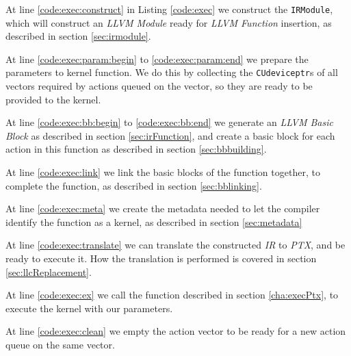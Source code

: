 At line \ref{code:exec:construct} in Listing \ref{code:exec} we construct the \texttt{IRModule}, which will construct an \textit{LLVM Module} ready for \textit{LLVM Function} insertion, as described in section \ref{sec:irmodule}.

At line \ref{code:exec:param:begin} to \ref{code:exec:param:end} we prepare the parameters to kernel function. We do this by collecting the \texttt{CUdeviceptr}s of all vectors required by actions queued on the vector, so they are ready to be provided to the kernel.

At line \ref{code:exec:bb:begin} to \ref{code:exec:bb:end} we generate an \textit{LLVM Basic Block} as described in section \ref{sec:irFunction}, and create a basic block for each action in this function as described in section \ref{sec:bbbuilding}.

At line \ref{code:exec:link} we link the basic blocks of the function together, to complete the function, as described in section \ref{sec:bblinking}.

At line \ref{code:exec:meta} we create the metadata needed to let the compiler identify the function as a kernel, as described in section \ref{sec:metadata}

At line \ref{code:exec:translate} we can translate the constructed \textit{IR} to \textit{PTX}, and be ready to execute it. How the translation is performed is covered in section \ref{sec:llcReplacement}.

At line \ref{code:exec:ex} we call the function described in section \ref{cha:execPtx}, to execute the kernel with our parameters.

At line \ref{code:exec:clean} we empty the action vector to be ready for a new action queue on the same vector.


